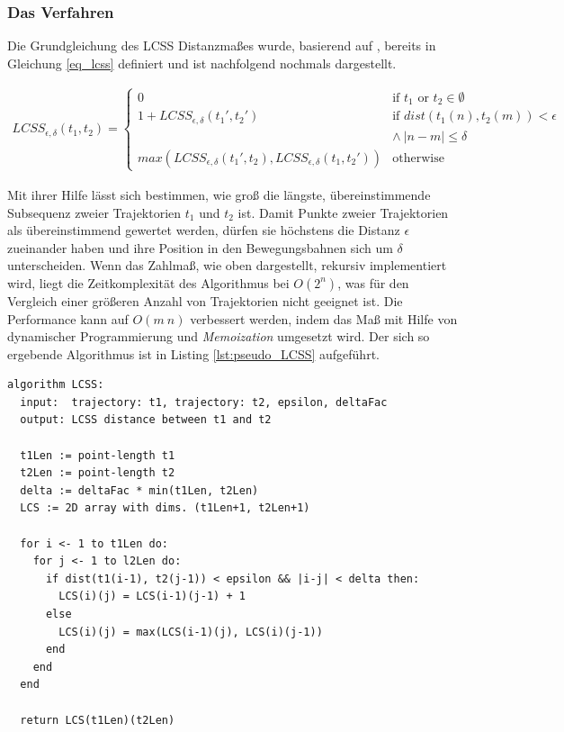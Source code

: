 \subsubsection{Das Verfahren}

Die Grundgleichung des LCSS Distanzmaßes wurde, basierend auf \cite[]{Vlachos2002}, bereits in Gleichung
\ref{eq_lcss} definiert und ist nachfolgend nochmals dargestellt.

\begin{ceqn}
\begin{align*}
    LCSS_{\epsilon, \delta}(t_1, t_2) =
    \begin{cases}
        0 & \text{if } t_1 \text{ or } t_2 \in \emptyset \\
        1 + LCSS_{\epsilon, \delta}(t_1', t_2') & \text{if } dist(t_1(n), t_2(m)) < \epsilon \\
        & \land\ |n - m| \leq \delta \\
        max(LCSS_{\epsilon, \delta}(t_1', t_2), LCSS_{\epsilon, \delta}(t_1, t_2')) & \text{otherwise}
    \end{cases}
\end{align*}
\end{ceqn}

Mit ihrer Hilfe lässt sich bestimmen, wie groß die längste, übereinstimmende Subsequenz zweier Trajektorien
$t_1$ und $t_2$ ist. Damit Punkte zweier Trajektorien als übereinstimmend gewertet werden, dürfen sie
höchstens die Distanz $\epsilon$ zueinander haben und ihre Position in den Bewegungsbahnen sich um $\delta$
unterscheiden.
Wenn das Zahlmaß, wie oben dargestellt, rekursiv implementiert wird, liegt die Zeitkomplexität des Algorithmus
bei $O(2^n)$, was für den Vergleich einer größeren Anzahl von Trajektorien nicht geeignet ist. Die Performance
kann auf $O(m\ n)$ verbessert werden, indem das Maß mit Hilfe von dynamischer Programmierung und \textit{Memoization}
umgesetzt wird. Der sich so ergebende Algorithmus ist in Listing \ref{lst:pseudo_LCSS} aufgeführt.
\begin{lstlisting}[caption=Pseudocode LCSS Bestimmung, language=Pseudo, label=lst:pseudo_LCSS] %TODO: evtl entfernen
algorithm LCSS:
  input:  trajectory: t1, trajectory: t2, epsilon, deltaFac
  output: LCSS distance between t1 and t2

  t1Len := point-length t1
  t2Len := point-length t2
  delta := deltaFac * min(t1Len, t2Len)
  LCS := 2D array with dims. (t1Len+1, t2Len+1)

  for i <- 1 to t1Len do:
    for j <- 1 to l2Len do:
      if dist(t1(i-1), t2(j-1)) < epsilon && |i-j| < delta then:
        LCS(i)(j) = LCS(i-1)(j-1) + 1
      else
        LCS(i)(j) = max(LCS(i-1)(j), LCS(i)(j-1))
      end
    end
  end

  return LCS(t1Len)(t2Len)
\end{lstlisting}

